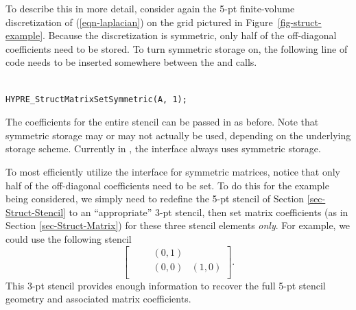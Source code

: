 To describe this in more detail, consider again the 5-pt finite-volume
discretization of (\ref{eqn-laplacian}) on the grid pictured in
Figure~\ref{fig-struct-example}.  Because the discretization is symmetric, only
half of the off-diagonal coefficients need to be stored.  To turn symmetric
storage on, the following line of code needs to be inserted somewhere between
the  and  calls.
\begin{display}
\begin{verbatim}

HYPRE_StructMatrixSetSymmetric(A, 1);

\end{verbatim}
\end{display}
The coefficients for the entire stencil can be passed in as before.  Note that
symmetric storage may or may not actually be used, depending on the underlying
storage scheme.  Currently in \hypre{}, the  interface always uses
symmetric storage.

To most efficiently utilize the  interface for symmetric matrices,
notice that only half of the off-diagonal coefficients need to be set.  To do
this for the example being considered, we simply need to redefine the 5-pt
stencil of Section \ref{sec-Struct-Stencil} to an ``appropriate'' 3-pt stencil,
then set matrix coefficients (as in Section \ref{sec-Struct-Matrix}) for these
three stencil elements {\em only}.  For example, we could use the following
stencil
\begin{equation}\label{eqn-symmetric-stencil}
\left [
\begin{array}{ccc}
~~~~~~ & ( 0, 1) &         \\
~~~~~~ & ( 0, 0) & ( 1, 0) \\
~~~~~~ &         &        
\end{array}
\right ] .
\end{equation}
This 3-pt stencil provides enough information to recover the full 5-pt stencil
geometry and associated matrix coefficients.
